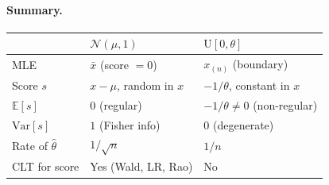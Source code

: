 \documentclass[a4paper,oneside,12pt]{extarticle}
\theoremstyle{plain}
\theoremstyle{definition}
\theoremstyle{remark}
\newcommand*{\E}{\mathbb{E}}
\newcommand*{\Var}{\mathrm{Var}}
\begin{document}
\paragraph{Summary.}
\begin{center}
\renewcommand{\arraystretch}{1.35}
\begin{tabular}{lll}
\hline
& $\mathcal{N}(\mu,1)$ & $\mathrm{U}[0,\theta]$ \\
\hline
MLE & $\bar x$ (score $=0$) & $x_{(n)}$ (boundary) \\
Score $s$  & $x-\mu$, random in $x$ & $-1/\theta$, constant in $x$ \\
$\E[s]$    & $0$ (regular)          & $-1/\theta\ne 0$ (non-regular) \\
$\Var[s]$  & $1$ (Fisher info)      & $0$ (degenerate) \\
Rate of $\hat\theta$ & $1/\sqrt{n}$ & $1/n$ \\
CLT for score & Yes (Wald, LR, Rao) & No \\
\hline
\end{tabular}
\end{center}

\end{document}
